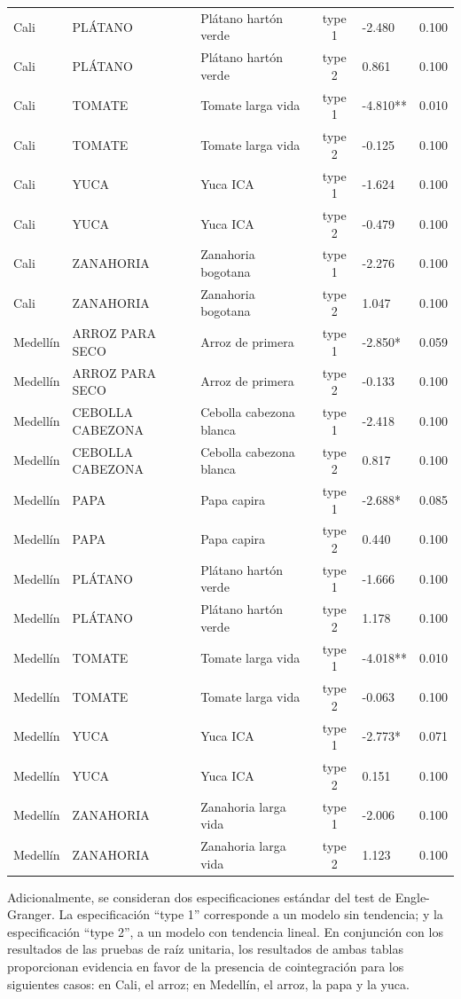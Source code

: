 \documentclass[
  12pt,
]{article}
\begin{document}
\begin{longtable}[t]{lllclc}
\addlinespace
Cali & PLÁTANO & Plátano hartón verde & type 1 & -2.480 & 0.100\\
Cali & PLÁTANO & Plátano hartón verde & type 2 & 0.861 & 0.100\\
Cali & TOMATE & Tomate larga vida & type 1 & -4.810** & 0.010\\
Cali & TOMATE & Tomate larga vida & type 2 & -0.125 & 0.100\\
Cali & YUCA & Yuca ICA & type 1 & -1.624 & 0.100\\
\addlinespace
Cali & YUCA & Yuca ICA & type 2 & -0.479 & 0.100\\
Cali & ZANAHORIA & Zanahoria bogotana & type 1 & -2.276 & 0.100\\
Cali & ZANAHORIA & Zanahoria bogotana & type 2 & 1.047 & 0.100\\
Medellín & ARROZ PARA SECO & Arroz de primera & type 1 & -2.850* & 0.059\\
Medellín & ARROZ PARA SECO & Arroz de primera & type 2 & -0.133 & 0.100\\
\addlinespace
Medellín & CEBOLLA CABEZONA & Cebolla cabezona blanca & type 1 & -2.418 & 0.100\\
Medellín & CEBOLLA CABEZONA & Cebolla cabezona blanca & type 2 & 0.817 & 0.100\\
Medellín & PAPA & Papa capira & type 1 & -2.688* & 0.085\\
Medellín & PAPA & Papa capira & type 2 & 0.440 & 0.100\\
Medellín & PLÁTANO & Plátano hartón verde & type 1 & -1.666 & 0.100\\
\addlinespace
Medellín & PLÁTANO & Plátano hartón verde & type 2 & 1.178 & 0.100\\
Medellín & TOMATE & Tomate larga vida & type 1 & -4.018** & 0.010\\
Medellín & TOMATE & Tomate larga vida & type 2 & -0.063 & 0.100\\
Medellín & YUCA & Yuca ICA & type 1 & -2.773* & 0.071\\
Medellín & YUCA & Yuca ICA & type 2 & 0.151 & 0.100\\
\addlinespace
Medellín & ZANAHORIA & Zanahoria larga vida & type 1 & -2.006 & 0.100\\
Medellín & ZANAHORIA & Zanahoria larga vida & type 2 & 1.123 & 0.100\\
\bottomrule
\end{longtable}
\endgroup{}

Adicionalmente, se consideran dos especificaciones estándar del test de
Engle-Granger. La especificación ``type 1'' corresponde a un modelo sin
tendencia; y la especificación ``type 2'', a un modelo con tendencia
lineal. En conjunción con los resultados de las pruebas de raíz
unitaria, los resultados de ambas tablas proporcionan evidencia en favor
de la presencia de cointegración para los siguientes casos: en Cali, el
arroz; en Medellín, el arroz, la papa y la yuca.
\end{document}
